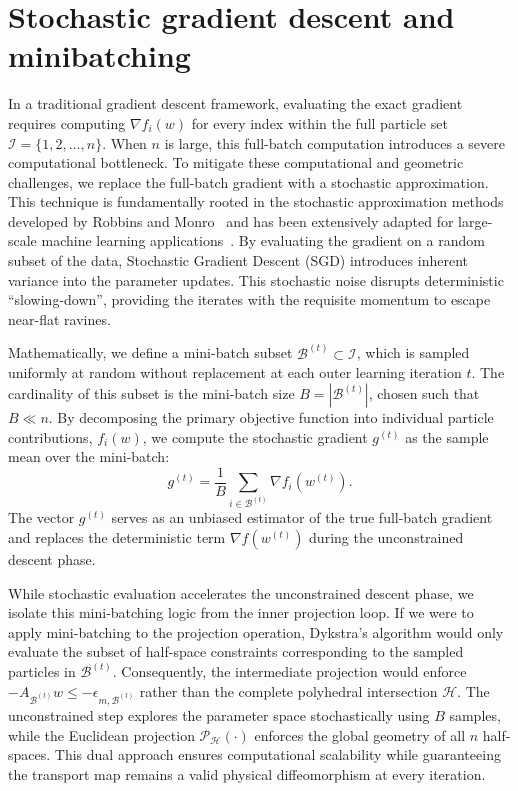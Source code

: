 \section{Stochastic gradient descent and minibatching} \label{sec:sgd_minibatching}

In a traditional gradient descent framework, evaluating the exact gradient requires computing $\nabla f_i(w)$ for every index within the full particle set $\mathcal{I} = \{1, 2, \dots, n\}$. When $n$ is large, this full-batch computation introduces a severe computational bottleneck. To mitigate these computational and geometric challenges, we replace the full-batch gradient with a stochastic approximation. This technique is fundamentally rooted in the stochastic approximation methods developed by Robbins and Monro~\cite{Robbins1951} and has been extensively adapted for large-scale machine learning applications~\cite{Bottou2010}. By evaluating the gradient on a random subset of the data, Stochastic Gradient Descent (SGD) introduces inherent variance into the parameter updates. This stochastic noise disrupts deterministic ``slowing-down'', providing the iterates with the requisite momentum to escape near-flat ravines.

Mathematically, we define a mini-batch subset $\mathcal{B}^{(t)} \subset \mathcal{I}$, which is sampled uniformly at random without replacement at each outer learning iteration $t$. The cardinality of this subset is the mini-batch size $B = |\mathcal{B}^{(t)}|$, chosen such that $B \ll n$. By decomposing the primary objective function into individual particle contributions, $f_i(w)$, we compute the stochastic gradient $g^{(t)}$ as the sample mean over the mini-batch:
\begin{equation*}
    g^{(t)} = \frac{1}{B} \sum_{i \in \mathcal{B}^{(t)}} \nabla f_i(w^{(t)}).
    \label{eq:stochastic_gradient}
\end{equation*}
The vector $g^{(t)}$ serves as an unbiased estimator of the true full-batch gradient and replaces the deterministic term $\nabla f(w^{(t)})$ during the unconstrained descent phase.

While stochastic evaluation accelerates the unconstrained descent phase, we isolate this mini-batching logic from the inner projection loop. If we were to apply mini-batching to the projection operation, Dykstra's algorithm would only evaluate the subset of half-space constraints corresponding to the sampled particles in $\mathcal{B}^{(t)}$. Consequently, the intermediate projection would enforce $-A_{\mathcal{B}^{(t)}} w \le -\epsilon_{m, \mathcal{B}^{(t)}}$ rather than the complete polyhedral intersection $\mathcal{H}$. The unconstrained step explores the parameter space stochastically using $B$ samples, while the Euclidean projection $\mathcal{P}_{\mathcal{H}}(\cdot)$ enforces the global geometry of all $n$ half-spaces. This dual approach ensures computational scalability while guaranteeing the transport map remains a valid physical diffeomorphism at every iteration.